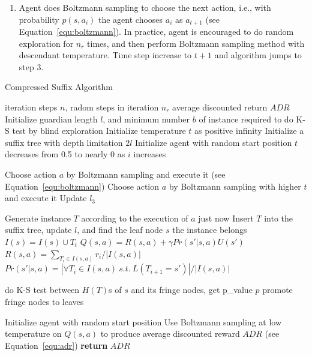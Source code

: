 \documentclass{article}
\begin{document}
\begin{enumerate}
  \item Agent does Boltzmann sampling to choose the next action, i.e., with
  probability $p(s, a_i)$ the agent chooses $a_i$ as $a_{t+1}$ (see Equation~\ref{equ:boltzmann}).
  In practice, agent is encouraged to do random exploration for $n_r$ times, and then perform
  Boltzmann sampling method with descendant temperature.
  Time step increase to $t+1$ and algorithm jumps to step 3.
\end{enumerate}

\begin{algorithm}[h]
	\renewcommand{\algorithmicrequire}{\textbf{Input:}}
	\renewcommand{\algorithmicensure}{\textbf{Output:}}
	\caption{Compressed Suffix Algorithm}
	\label{alg:CSM}
	\begin{algorithmic}[1]
		\REQUIRE iteration steps $n$, radom steps in iteration $n_r$
		\ENSURE average discounted return $ADR$
    \STATE Initialize guardian length $l$, and minimum number $b$ of instance required to do K-S test
    by blind exploration
    \STATE Initialize temperature $t$ as positive infinity
    \STATE Initialize a suffix tree with depth limitation $2l$
    \STATE Initialize agent with random start position
		    \STATE $t$ decreases from 0.5 to nearly 0 as $i$ increases
      \ENDIF

      \STATE Choose action $a$ by Boltzmann sampling and execute it (see Equation~\ref{equ:boltzmann})
        \STATE Choose action $a$ by Boltzmann sampling with higher $t$ and execute it
		    \STATE Update $l_3$
      \ENDIF
      \ENDWHILE

      \STATE Generate instance $T$ according to the execution of $a$ just now
      \STATE Insert $T$ into the suffix tree, update $l$, and find the leaf node $s$ the instance belongs
      \STATE $I(s) = I(s) \cup {T_t}$
      \STATE $Q(s,a) = R(s,a) + \gamma Pr(s'|s,a)U(s')$
      \STATE $R(s,a) = {\sum_{T_i \in I(s,a)}r_i}/{|I(s,a)|}$
      \STATE $Pr(s'|s,a) = {|\forall{T_i \in I(s,a) \ s.t. \ L(T_{i+1} = s')}|} / {|I(s,a)|}$
      
        \STATE do K-S test between $H(T)$s of $s$ and its fringe nodes, get p\_value $p$ 
          \STATE promote fringe nodes to leaves
        \ENDIF
      \ENDIF

        \STATE Initialize agent with random start position
      \ENDIF
    \ENDFOR
    \STATE Use Boltzmann sampling at low temperature on $Q(s, a)$ to produce average
    discounted reward $ADR$ (see Equation~\ref{equ:adr})
		\STATE \textbf{return} $ADR$
	\end{algorithmic}  
\end{algorithm}
\end{document}
